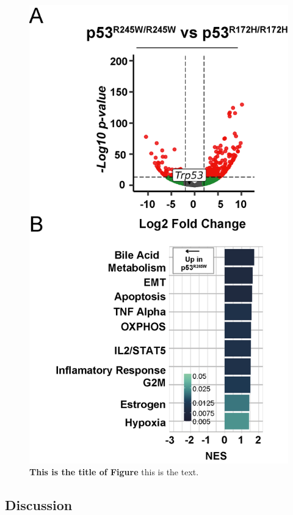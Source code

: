 \begin{figure}
\hypertarget{fig:04}{%
\centering
\includegraphics[width=1\textwidth,height=\textheight]{images/p5310.png}
\caption{\textbf{This is the title of Figure} this is the text.}\label{fig:04}
}
\end{figure}

\hypertarget{discussion-1}{%
\subsection{Discussion}\label{discussion-1}}

